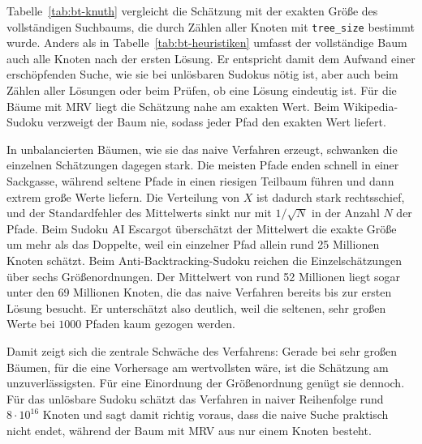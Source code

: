 Tabelle~\ref{tab:bt-knuth} vergleicht die Schätzung mit der exakten Größe des vollständigen Suchbaums, 
die durch Zählen aller Knoten mit \texttt{tree\_size} bestimmt wurde. 
Anders als in Tabelle~\ref{tab:bt-heuristiken} umfasst der vollständige Baum auch alle Knoten nach der ersten Lösung. 
Er entspricht damit dem Aufwand einer erschöpfenden Suche, wie sie bei unlösbaren Sudokus nötig ist, aber auch beim Zählen aller Lösungen oder beim Prüfen, ob eine Lösung eindeutig ist. 
Für die Bäume mit \ac{MRV} liegt die Schätzung nahe am exakten Wert. 
Beim Wikipedia-Sudoku verzweigt der Baum nie, sodass jeder Pfad den exakten Wert liefert.

In unbalancierten Bäumen, wie sie das naive Verfahren erzeugt, schwanken die einzelnen Schätzungen dagegen stark. 
Die meisten Pfade enden schnell in einer Sackgasse, 
während seltene Pfade in einen riesigen Teilbaum führen und dann extrem große Werte liefern. 
Die Verteilung von $X$ ist dadurch stark rechtsschief, 
und der Standardfehler des Mittelwerts sinkt nur mit $1/\sqrt{N}$ in der Anzahl $N$ der Pfade. 
Beim Sudoku AI Escargot überschätzt der Mittelwert die exakte Größe um mehr als das Doppelte, 
weil ein einzelner Pfad allein rund 25 Millionen Knoten schätzt. 
Beim Anti-Backtracking-Sudoku reichen die Einzelschätzungen über sechs Größenordnungen. 
Der Mittelwert von rund 52 Millionen liegt sogar unter den 69 Millionen Knoten, 
die das naive Verfahren bereits bis zur ersten Lösung besucht. 
Er unterschätzt also deutlich, weil die seltenen, sehr großen Werte bei $1000$ Pfaden kaum gezogen werden.

Damit zeigt sich die zentrale Schwäche des Verfahrens: 
Gerade bei sehr großen Bäumen, für die eine Vorhersage am wertvollsten wäre, ist die Schätzung am unzuverlässigsten. 
Für eine Einordnung der Größenordnung genügt sie dennoch. 
Für das unlösbare Sudoku schätzt das Verfahren in naiver Reihenfolge rund $8 \cdot 10^{16}$ Knoten 
und sagt damit richtig voraus, dass die naive Suche praktisch nicht endet, 
während der Baum mit \ac{MRV} aus nur einem Knoten besteht.

